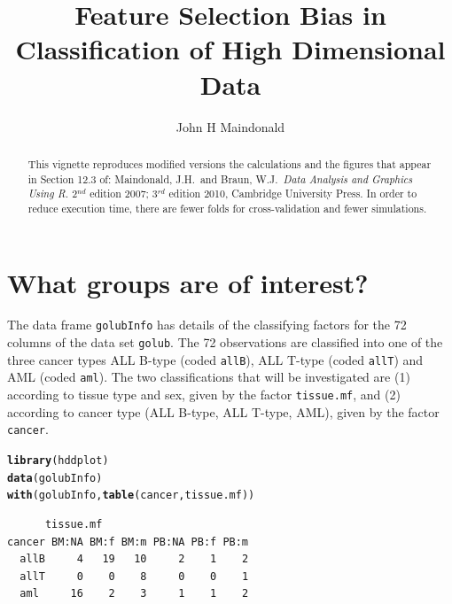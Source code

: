\documentclass{article}\usepackage[]{graphicx}\usepackage[]{xcolor}
\makeatletter
\newcommand{\hlstd}[1]{\textcolor[rgb]{0.345,0.345,0.345}{#1}}%
\newcommand{\hlkwd}[1]{\textcolor[rgb]{0.737,0.353,0.396}{\textbf{#1}}}%
\newenvironment{kframe}{%
 \def\at@end@of@kframe{}%
 \ifinner\ifhmode%
  \def\at@end@of@kframe{\end{minipage}}%
  \begin{minipage}{\columnwidth}%
 \fi\fi%
 \def\FrameCommand##1{\hskip\@totalleftmargin \hskip-\fboxsep
 \colorbox{shadecolor}{##1}\hskip-\fboxsep
     \hskip-\linewidth \hskip-\@totalleftmargin \hskip\columnwidth}%
 \MakeFramed {\advance\hsize-\width
   \@totalleftmargin\z@ \linewidth\hsize
   \@setminipage}}%
 {\par\unskip\endMakeFramed%
 \at@end@of@kframe}
\newenvironment{knitrout}{}{} %
\makeatother
\begin{document}

\title{Feature Selection Bias in Classification of High Dimensional Data}
\author{John H Maindonald}
\maketitle



\begin{abstract}
This vignette reproduces modified versions the calculations and the figures
  that appear in Section 12.3 of:
  \noindent Maindonald, J.H.\ and Braun, W.J.\ {\em Data Analysis and
    Graphics Using R.} 2$^{nd}$ edition 2007; 3$^{rd}$ edition 2010,
  Cambridge University Press.  In order to reduce execution time,
  there are fewer folds for cross-validation and fewer simulations.
\end{abstract}

\section{What groups are of interest?}
The data frame \texttt{golubInfo} has details of the classifying
factors for the 72 columns of the data set \texttt{golub}.  The 72
observations are classified into one of the three cancer types ALL
B-type (coded \texttt{allB}), ALL T-type (coded \texttt{allT}) and AML
(coded \texttt{aml}).  The two classifications that will be
investigated are (1) according to tissue type and sex, given by the
factor \texttt{tissue.mf}, and (2) according to cancer type (ALL
B-type, ALL T-type, AML), given by the factor \texttt{cancer}.
\begin{knitrout}
\color{fgcolor}\begin{kframe}
\begin{alltt}
\hlkwd{library}\hlstd{(hddplot)}
\hlkwd{data}\hlstd{(golubInfo)}
\hlkwd{with}\hlstd{(golubInfo,} \hlkwd{table}\hlstd{(cancer, tissue.mf))}
\end{alltt}
\begin{verbatim}
      tissue.mf
cancer BM:NA BM:f BM:m PB:NA PB:f PB:m
  allB     4   19   10     2    1    2
  allT     0    0    8     0    0    1
  aml     16    2    3     1    1    2
\end{verbatim}
\end{kframe}
\end{knitrout}
\end{document}
